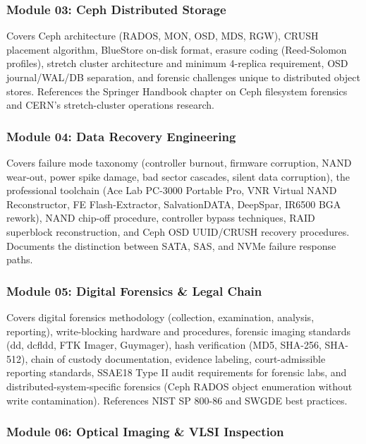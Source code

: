 \documentclass[11pt,letterpaper]{article}
\begin{document}
\subsubsection{Module 03: Ceph Distributed Storage}

Covers Ceph architecture (RADOS, MON, OSD, MDS, RGW), CRUSH placement algorithm, BlueStore on-disk format, erasure coding (Reed-Solomon profiles), stretch cluster architecture and minimum 4-replica requirement, OSD journal/WAL/DB separation, and forensic challenges unique to distributed object stores. References the Springer Handbook chapter on Ceph filesystem forensics and CERN's stretch-cluster operations research.

\subsubsection{Module 04: Data Recovery Engineering}

Covers failure mode taxonomy (controller burnout, firmware corruption, NAND wear-out, power spike damage, bad sector cascades, silent data corruption), the professional toolchain (Ace Lab PC-3000 Portable Pro, VNR Virtual NAND Reconstructor, FE Flash-Extractor, SalvationDATA, DeepSpar, IR6500 BGA rework), NAND chip-off procedure, controller bypass techniques, RAID superblock reconstruction, and Ceph OSD UUID/CRUSH recovery procedures. Documents the distinction between SATA, SAS, and NVMe failure response paths.

\subsubsection{Module 05: Digital Forensics \& Legal Chain}

Covers digital forensics methodology (collection, examination, analysis, reporting), write-blocking hardware and procedures, forensic imaging standards (dd, dcfldd, FTK Imager, Guymager), hash verification (MD5, SHA-256, SHA-512), chain of custody documentation, evidence labeling, court-admissible reporting standards, SSAE18 Type II audit requirements for forensic labs, and distributed-system-specific forensics (Ceph RADOS object enumeration without write contamination). References NIST SP 800-86 and SWGDE best practices.

\subsubsection{Module 06: Optical Imaging \& VLSI Inspection}
\end{document}
